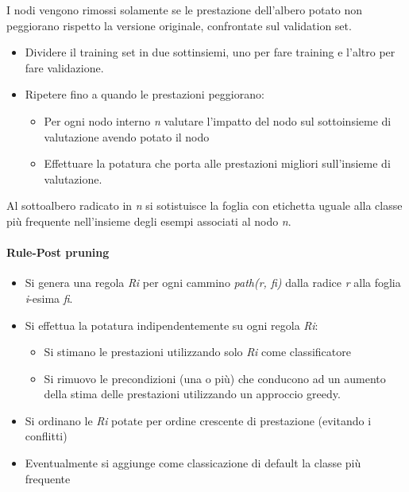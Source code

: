 I nodi vengono rimossi solamente se le prestazione dell'albero potato
non peggiorano rispetto la versione originale, confrontate sul
validation set.

\begin{itemize}
\tightlist
\item
  Dividere il training set in due sottinsiemi, uno per fare training e
  l'altro per fare validazione.
\item
  Ripetere fino a quando le prestazioni peggiorano:

  \begin{itemize}
  \tightlist
  \item
    Per ogni nodo interno \emph{n} valutare l'impatto del nodo sul
    sottoinsieme di valutazione avendo potato il nodo
  \item
    Effettuare la potatura che porta alle prestazioni migliori
    sull'insieme di valutazione.
  \end{itemize}
\end{itemize}

Al sottoalbero radicato in \emph{n} si sotistuisce la foglia con
etichetta uguale alla classe più frequente nell'insieme degli esempi
associati al nodo \emph{n}.

\paragraph{Rule-Post pruning}\label{rule-post-pruning}

\begin{itemize}
\tightlist
\item
  Si genera una regola \emph{Ri} per ogni cammino \emph{path(r, fi)}
  dalla radice \emph{r} alla foglia \emph{i}-esima \emph{fi}.
\item
  Si effettua la potatura indipendentemente su ogni regola \emph{Ri}:

  \begin{itemize}
  \tightlist
  \item
    Si stimano le prestazioni utilizzando solo \emph{Ri} come
    classificatore
  \item
    Si rimuovo le precondizioni (una o più) che conducono ad un aumento
    della stima delle prestazioni utilizzando un approccio greedy.
  \end{itemize}
\item
  Si ordinano le \emph{Ri} potate per ordine crescente di prestazione
  (evitando i conflitti)
\item
  Eventualmente si aggiunge come classicazione di default la classe più
  frequente
\end{itemize}

